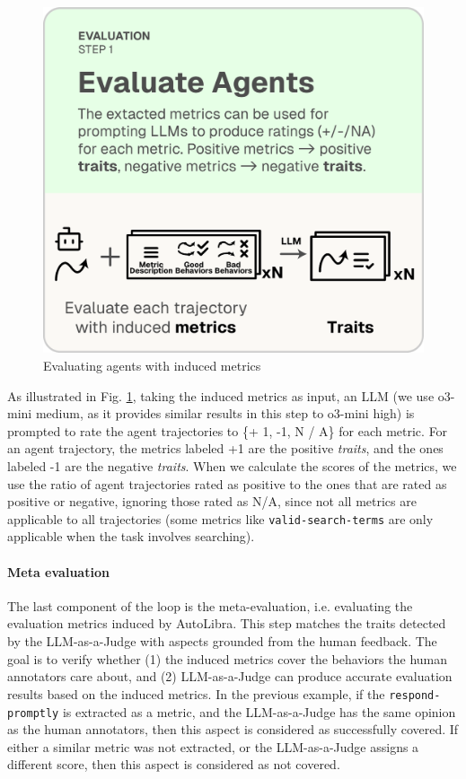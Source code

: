 \begin{figure}
  \vspace{-15pt}
  \includegraphics[width=\linewidth]{figs/autolibra_step_3.pdf}
  \vspace{-10pt}
  \caption{\small Evaluating agents with induced metrics}
  \label{fig:llm_as_a_judge}
\end{figure}
As illustrated in Fig. \ref{fig:llm_as_a_judge}, taking the induced metrics as input, an LLM (we use o3-mini medium,
as it provides similar results in this step to o3-mini high) is prompted to rate the agent trajectories to \{+ 1, -1, N / A\} for each metric. For an agent trajectory, the metrics labeled +1 are
the positive \emph{traits}, and the ones labeled -1 are the negative \emph{traits}. When we calculate the scores of
the metrics, we use the ratio of agent trajectories rated as positive
to the ones that are rated as positive or negative, ignoring those rated as N/A,
since not all metrics are applicable to all trajectories
(some metrics like \texttt{valid-search-terms} are only applicable when the task
involves searching). 


\paragraph{Meta evaluation}
The last component of the loop is the meta-evaluation, i.e. evaluating the evaluation metrics induced by AutoLibra.
This step matches the traits detected by the LLM-as-a-Judge with aspects
grounded from the human feedback. The goal is to verify whether (1) the induced metrics cover the behaviors the human annotators care about, and (2) LLM-as-a-Judge can produce
accurate evaluation results based on the induced metrics. In the previous example,
if the \texttt{respond-promptly} is extracted as a metric, and the LLM-as-a-Judge
has the same opinion as the human annotators, then this aspect is considered as successfully covered.
If either a similar metric was not extracted, or the LLM-as-a-Judge assigns a different score,
then this aspect is considered as not covered.

